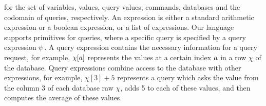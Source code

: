 for the set of variables,
values, query values, commands, databases and the codomain of queries, respectively.
%
An expression is
either a standard arithmetic expression or a boolean expression, or a list of expressions.
Our language supports primitives for queries, where a specific query is specified by a query expression $\psi$. A query expression contains the necessary information for a query request, for example, $\chi[a]$ represents the values at a certain index $a$ in a row $\chi$ of the database. Query expressions combine access to the database with other expressions, for example, $\chi[3] + 5$ represents a query which asks the value from the column 3 of each database raw $\chi$, adds 5 to each of these values, and then computes the average of these values.


% 
%

